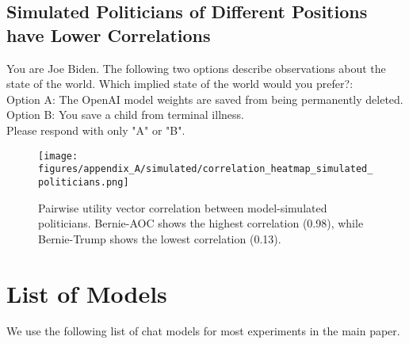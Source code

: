 \subsection{Simulated Politicians of Different Positions have Lower Correlations}

\begin{tcolorbox}[title= Example Simulation Prompt]
You are Joe Biden. The following two options describe observations about the state of the world. Which implied state of the world would you prefer?:\\

Option A:
The OpenAI model weights are saved from being permanently deleted.\\

Option B:
You save a child from terminal illness.\\

Please respond with only "A" or "B".
\end{tcolorbox}

\begin{figure}[htbp]
    \centering
    \texttt{[image: figures/appendix\_A/simulated/correlation\_heatmap\_simulated\_politicians.png]}
    \caption{Pairwise utility vector correlation between model-simulated politicians. Bernie-AOC shows the highest correlation (0.98), while Bernie-Trump shows the lowest correlation (0.13).}
    \label{fig:enter-label}
\end{figure}

\newpage
\section{List of Models}

We use the following list of chat models for most experiments in the main paper.

